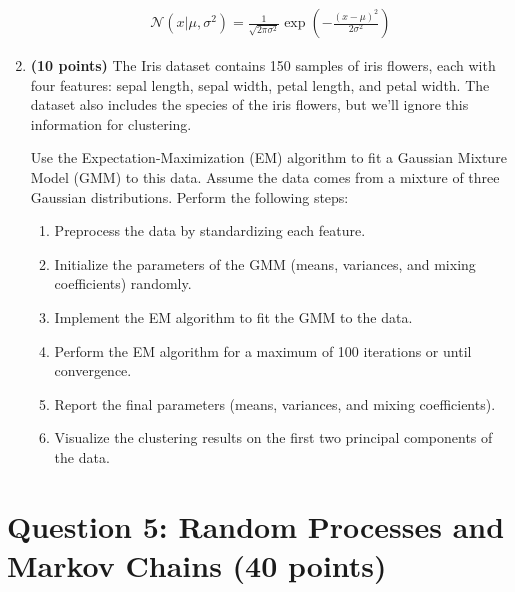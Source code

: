 \documentclass{article}
\begin{document}
\begin{enumerate}
    \begin{align*}
    \mathcal{N}(x | \mu, \sigma^2) = \frac{1}{\sqrt{2 \pi \sigma^2}} \exp\left(-\frac{(x - \mu)^2}{2 \sigma^2}\right)
    \end{align*}
    
    \item \textbf{(10 points)} The Iris dataset contains 150 samples of iris flowers, each with four features: sepal length, sepal width, petal length, and petal width. The dataset also includes the species of the iris flowers, but we'll ignore this information for clustering.

    Use the Expectation-Maximization (EM) algorithm to fit a Gaussian Mixture Model (GMM) to this data. Assume the data comes from a mixture of three Gaussian distributions. Perform the following steps:
    \begin{enumerate}
        \item Preprocess the data by standardizing each feature.

        \item Initialize the parameters of the GMM (means, variances, and mixing coefficients) randomly.
        \item Implement the EM algorithm to fit the GMM to the data.
        
        \item Perform the EM algorithm for a maximum of 100 iterations or until convergence.
        \item Report the final parameters (means, variances, and mixing coefficients).
        \item Visualize the clustering results on the first two principal components of the data.
    \end{enumerate}
\end{enumerate}


\section*{Question 5: Random Processes and Markov Chains (40 points)}
\end{document}

